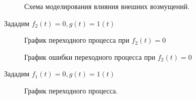 \documentclass[a4paper, 11pt]{article}
\begin{document}
\begin{figure}[h]
    \caption{Схема моделирования влияния внешних возмущений.}
    \label{tree}
\end{figure}

Зададим $f_2(t) = 0, g(t) = 1(t)$

\begin{figure}[h!]
    \caption{График переходного процесса при $f_2(t) = 0$}
    \label{two}
\end{figure}

\begin{figure}[h!]
    \caption{График ошибки переходного процесса при $f_2(t) = 0$}
    \label{tree}
\end{figure}

\newpage

Зададим $f_1(t) = 0, g(t) = 1(t)$

\begin{figure}[h]
    \caption{График переходного процесса.}
    \label{two}
\end{figure}
    
\end{document}
